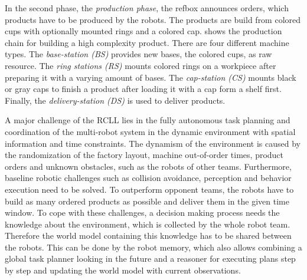 In the second phase, the \emph{production phase}, the refbox announces
orders, which products have to be produced by the robots. The products
are build from colored cups with optionally mounted rings and a
colored cap.   shows the production chain for
building a high complexity product.  There are four different machine
types. The \emph{base-station (BS)} provides new bases, the colored
cups, as raw resource. The \emph{ring stations (RS)} mounts colored
rings on a workpiece after preparing it with a varying amount of
bases.  The \emph{cap-station (CS)} mounts black or gray caps to
finish a product after loading it with a cap form a shelf first.
Finally, the \emph{delivery-station (DS)} is used to deliver products.

A major challenge of the RCLL lies in the fully autonomous task
planning and coordination of the multi-robot system in the dynamic
environment with spatial information and time constraints. The
dynamism of the environment is caused by the randomization of the factory
layout, machine out-of-order times, product orders and
unknown obstacles, such as the robots of other teams. Furthermore,
baseline robotic challenges such as collision avoidance, perception
and behavior execution need to be solved. To outperform opponent
teams, the robots have to build as many ordered products as possible
and deliver them in the given time window. To cope with these
challenges, a decision making process needs the knowledge about the
environment, which is collected by the whole robot team. Therefore the
world model containing this knowledge has to be shared between the robots.
This can be done by the robot memory, which also allows
combining a global task planner looking in the future and a reasoner
for executing plans step by step and updating the world model with
current observations.

